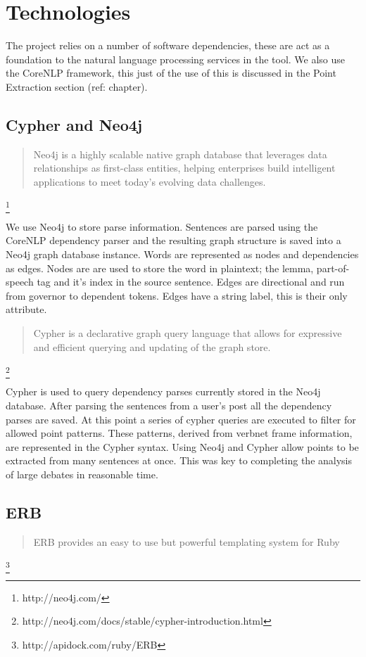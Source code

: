 \chapter{Technologies\label{chap:technologies}}
  The project relies on a number of software dependencies, these are act as a foundation to the natural language processing services in the tool. We also use the CoreNLP framework, this just of the use of this is discussed in the Point Extraction section (ref: chapter).

  \tocless\section{Cypher and Neo4j}
    \blockquote{Neo4j is a highly scalable native graph database that leverages data relationships as first-class entities, helping enterprises build intelligent applications to meet today's evolving data challenges.} \footnote{http://neo4j.com/}

    We use Neo4j to store parse information. Sentences are parsed using the CoreNLP dependency parser and the resulting graph structure is saved into a Neo4j graph database instance. Words are represented as nodes and dependencies as edges. Nodes are are used to store the word in plaintext; the lemma, part-of-speech tag and it's index in the source sentence. Edges are directional and run from governor to dependent tokens. Edges have a string label, this is their only attribute.

    \blockquote{Cypher is a declarative graph query language that allows for expressive and efficient querying and updating of the graph store.} \footnote{http://neo4j.com/docs/stable/cypher-introduction.html}

    Cypher is used to query dependency parses currently stored in the Neo4j database. After parsing the sentences from a user's post all the dependency parses are saved. At this point a series of cypher queries are executed to filter for allowed point patterns. These patterns, derived from verbnet frame information, are represented in the Cypher syntax. Using Neo4j and Cypher allow points to be extracted from many sentences at once. This was key to completing the analysis of large debates in reasonable time.

  \tocless\section{ERB}
    \blockquote{ERB provides an easy to use but powerful templating system for Ruby} \footnote{http://apidock.com/ruby/ERB}

